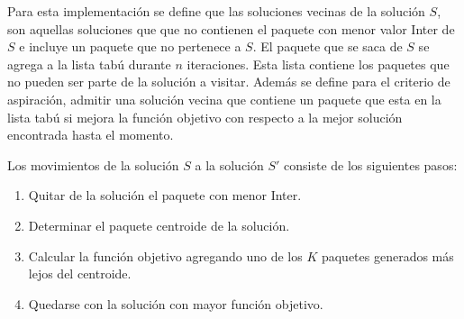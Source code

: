 Para esta implementación se define que las soluciones vecinas de la solución $S$, son aquellas soluciones que que no contienen el paquete con menor valor Inter de $S$ e incluye un paquete que no pertenece a $S$. El paquete que se saca de $S$ se agrega a la lista tabú durante $n$ iteraciones. Esta lista contiene los paquetes que no pueden ser parte de la solución a visitar. Además se define para el criterio de aspiración, admitir una solución vecina que contiene un paquete que esta en la lista tabú si mejora la función objetivo con respecto a la mejor solución encontrada hasta el momento. 

Los movimientos de la solución $S$ a la solución $S'$ consiste de los siguientes  pasos:
\begin{enumerate}
	\item Quitar de la solución el paquete con menor Inter.
	\item Determinar el paquete centroide de la solución.
	\item Calcular la función objetivo agregando uno de los $K$ paquetes generados más lejos del centroide.
	\item Quedarse con la solución con mayor función objetivo. 
\end{enumerate}

